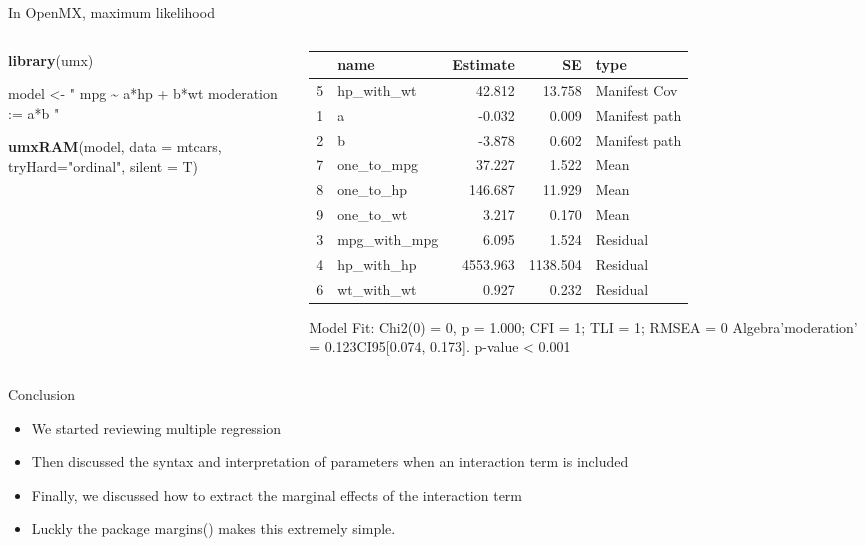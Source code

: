 \documentclass[australian,ignorenonframetext,aspectratio=169]{beamer}
\newenvironment{Shaded}{\begin{snugshade}}{\end{snugshade}}
\newcommand{\DataTypeTok}[1]{\textcolor[rgb]{0.13,0.29,0.53}{#1}}
\newcommand{\KeywordTok}[1]{\textcolor[rgb]{0.13,0.29,0.53}{\textbf{#1}}}
\newcommand{\NormalTok}[1]{#1}
\newcommand{\StringTok}[1]{\textcolor[rgb]{0.31,0.60,0.02}{#1}}
\providecommand{\tightlist}{%
  \setlength{\itemsep}{0pt}\setlength{\parskip}{0pt}}
\begin{document}
\begin{frame}[fragile]{In OpenMX, maximum likelihood}
\protect\hypertarget{in-openmx-maximum-likelihood}{}

\begin{columns}[T]
\begin{column}{0.4\textwidth}
\tiny

\begin{Shaded}
\begin{Highlighting}[]
\KeywordTok{library}\NormalTok{(umx)}

\NormalTok{model \textless{}{-}}\StringTok{ "}
\StringTok{  mpg \textasciitilde{} a*hp + b*wt }
\StringTok{  moderation := a*b}
\StringTok{"}

\KeywordTok{umxRAM}\NormalTok{(model, }\DataTypeTok{data =}\NormalTok{ mtcars, }\DataTypeTok{tryHard=}\StringTok{"ordinal"}\NormalTok{, }
       \DataTypeTok{silent =}\NormalTok{ T)}
\end{Highlighting}
\end{Shaded}
\end{column}

\begin{column}{0.6\textwidth}
\tiny

\begin{longtable}[]{@{}llrrl@{}}
\toprule
& name & Estimate & SE & type\tabularnewline
\midrule
\endhead
5 & hp\_with\_wt & 42.812 & 13.758 & Manifest Cov\tabularnewline
1 & a & -0.032 & 0.009 & Manifest path\tabularnewline
2 & b & -3.878 & 0.602 & Manifest path\tabularnewline
7 & one\_to\_mpg & 37.227 & 1.522 & Mean\tabularnewline
8 & one\_to\_hp & 146.687 & 11.929 & Mean\tabularnewline
9 & one\_to\_wt & 3.217 & 0.170 & Mean\tabularnewline
3 & mpg\_with\_mpg & 6.095 & 1.524 & Residual\tabularnewline
4 & hp\_with\_hp & 4553.963 & 1138.504 & Residual\tabularnewline
6 & wt\_with\_wt & 0.927 & 0.232 & Residual\tabularnewline
\bottomrule
\end{longtable}

Model Fit: Chi2(0) = 0, p = 1.000; CFI = 1; TLI = 1; RMSEA = 0
Algebra'moderation' = 0.123CI95{[}0.074, 0.173{]}. p-value \textless{}
0.001
\end{column}
\end{columns}

\end{frame}

\begin{frame}{Conclusion}
\protect\hypertarget{conclusion}{}

\begin{itemize}
\tightlist
\item
  We started reviewing multiple regression
\item
  Then discussed the syntax and interpretation of parameters when an
  interaction term is included
\item
  Finally, we discussed how to extract the marginal effects of the
  interaction term
\item
  Luckly the package margins() makes this extremely simple.
\end{itemize}

\end{frame}
\end{document}
